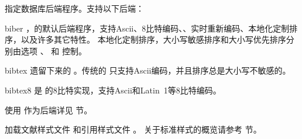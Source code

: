 \begin{optionlist}



指定数据库后端程序。支持以下后端：

\begin{valuelist}
	
\item[biber] %
\biber{}，\biblatex 的默认后端程序，支持Ascii、8比特编码、\utf{}、实时重新编码、本地化定制排序，以及许多其它特性。
本地化定制排序，大小写敏感排序和大小写优先排序分别由选项 、 和  控制。

\item[bibtex] %
遗留下来的 \BibTeX{}。传统的 \BibTeX 只支持Ascii编码，并且排序总是大小写不敏感的。
	
\item[bibtex8] %
 是 \BibTeX 的8比特实现，支持Ascii和Latin~1等8比特编码。

\end{valuelist}

使用 \BibTeX 作为后端详见  节。



加载文献样式文件  和引用样式文件 。
关于标准样式的概览请参考  节。




\end{optionlist}

